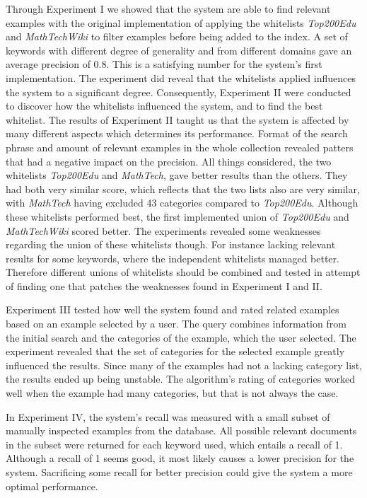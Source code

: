 Through Experiment I we showed that the system are able to find relevant examples with the original implementation of applying the whitelists \textit{Top200Edu} and \textit{MathTechWiki} to filter examples before being added to the index. A set of keywords with different degree of generality and from different domains gave an average precision of \(0.8\). This is a satisfying number for the system's first implementation. The experiment did reveal that the whitelists applied influences the system to a significant degree. Consequently, Experiment II were conducted to discover how the whitelists influenced the system, and to find the best whitelist. The results of Experiment II taught us that the system is affected by many different aspects which determines its performance. Format of the search phrase and amount of relevant examples in the whole collection revealed patters that had a negative impact on the precision. All things considered, the two whitelists \textit{Top200Edu} and \textit{MathTech}, gave better results than the others. They had both very similar score, which reflects that the two lists also are very similar, with \textit{MathTech} having excluded 43 categories compared to \textit{Top200Edu}. Although these whitelists performed best, the first implemented union of \textit{Top200Edu} and \textit{MathTechWiki} scored better. The experiments revealed some weaknesses regarding the union of these whitelists though. For instance lacking relevant results for some keywords, where the independent whitelists managed better. Therefore different unions of whitelists should be combined and tested in attempt of finding one that patches the weaknesses found in Experiment I and II.

Experiment III tested how well the system found and rated related examples based on an example selected by a user. The query combines information from the initial search and the categories of the example, which the user selected. The experiment revealed that the set of categories for the selected example greatly influenced the results. Since many of the examples had not a lacking category list, the results ended up being unstable. The algorithm's rating of categories worked well when the example had many categories, but that is not always the case.

In Experiment IV, the system's recall was measured with a small subset of manually inspected examples from the database. All possible relevant documents in the subset were returned for each keyword used, which entails a recall of 1. Although a recall of 1 seems good, it most likely causes a lower precision for the system. Sacrificing some recall for better precision could give the system a more optimal performance.


